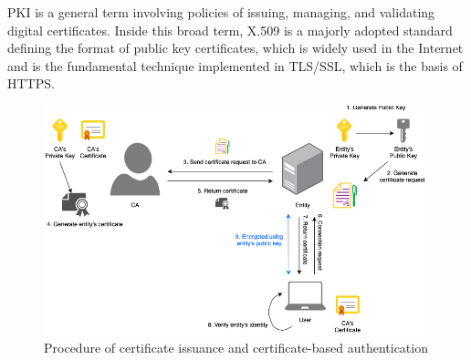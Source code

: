 PKI is a general term involving policies of issuing, managing, and validating digital certificates. Inside this broad term, X.509\cite{rfc4158} is a majorly adopted standard defining the format of public key certificates, which is widely used in the Internet and is the fundamental technique implemented in TLS/SSL, which is the basis of HTTPS.

\begin{figure}[hbt]
\centering
  \includegraphics[width=14cm]{figures/pki.png}
  \caption{Procedure of certificate issuance and certificate-based authentication}
  \label{fig:pki}
\end{figure}